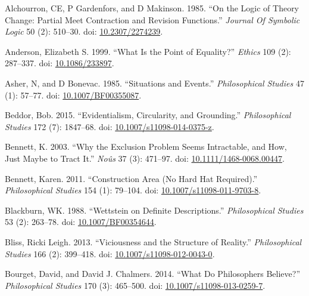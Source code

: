 \documentclass[
  10pt,
  letterpaper,
  DIV=11,
  numbers=noendperiod,
  twoside]{scrartcl}
\newlength{\cslhangindent}
\newenvironment{CSLReferences}[2] %
 {\begin{list}{}{%
  \setlength{\itemindent}{0pt}
  \setlength{\leftmargin}{0pt}
  \setlength{\parsep}{0pt}
  \ifodd #1
   \setlength{\leftmargin}{\cslhangindent}
   \setlength{\itemindent}{-1\cslhangindent}
  \fi
  \setlength{\itemsep}{#2\baselineskip}}}
 {\end{list}}
\begin{document}
\label{refs}
\begin{CSLReferences}{1}{0}
Alchourron, CE, P Gardenfors, and D Makinson. 1985. {``On the Logic of
Theory Change: Partial Meet Contraction and Revision Functions.''}
\emph{Journal Of Symbolic Logic} 50 (2): 510--30. doi:
\href{https://doi.org/10.2307/2274239}{10.2307/2274239}.

Anderson, Elizabeth S. 1999. {``What Is the Point of Equality?''}
\emph{Ethics} 109 (2): 287--337. doi:
\href{https://doi.org/10.1086/233897}{10.1086/233897}.

Asher, N, and D Bonevac. 1985. {``Situations and Events.''}
\emph{Philosophical Studies} 47 (1): 57--77. doi:
\href{https://doi.org/10.1007/BF00355087}{10.1007/BF00355087}.

Beddor, Bob. 2015. {``Evidentialism, Circularity, and Grounding.''}
\emph{Philosophical Studies} 172 (7): 1847--68. doi:
\href{https://doi.org/10.1007/s11098-014-0375-z}{10.1007/s11098-014-0375-z}.

Bennett, K. 2003. {``Why the Exclusion Problem Seems Intractable, and
How, Just Maybe to Tract It.''} \emph{No{û}s} 37 (3): 471--97. doi:
\href{https://doi.org/10.1111/1468-0068.00447}{10.1111/1468-0068.00447}.

Bennett, Karen. 2011. {``Construction Area (No Hard Hat Required).''}
\emph{Philosophical Studies} 154 (1): 79--104. doi:
\href{https://doi.org/10.1007/s11098-011-9703-8}{10.1007/s11098-011-9703-8}.

Blackburn, WK. 1988. {``Wettstein on Definite Descriptions.''}
\emph{Philosophical Studies} 53 (2): 263--78. doi:
\href{https://doi.org/10.1007/BF00354644}{10.1007/BF00354644}.

Bliss, Ricki Leigh. 2013. {``Viciousness and the Structure of
Reality.''} \emph{Philosophical Studies} 166 (2): 399--418. doi:
\href{https://doi.org/10.1007/s11098-012-0043-0}{10.1007/s11098-012-0043-0}.

Bourget, David, and David J. Chalmers. 2014. {``What Do Philosophers
Believe?''} \emph{Philosophical Studies} 170 (3): 465--500. doi:
\href{https://doi.org/10.1007/s11098-013-0259-7}{10.1007/s11098-013-0259-7}.


\end{CSLReferences}
\end{document}
